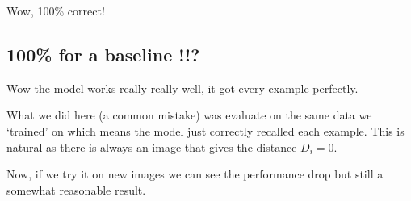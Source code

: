 \documentclass[letterpaper,10pt,english]{sphinxmanual}
\begin{document}
\noindent{}

\sphinxAtStartPar
Wow, 100\% correct!


\subsection{100\% for a baseline !!?}
\label{\detokenize{03-Datasets:for-a-baseline}}
\sphinxAtStartPar
Wow the model works really really well, it got every example perfectly.

\sphinxAtStartPar
What we did here (a common mistake) was evaluate on the same data we ‘trained’ on which means the model just correctly recalled each example. This is natural as there is always an image that gives the distance \(D_i=0\).

\sphinxAtStartPar
Now, if we try it on new images we can see the performance drop but still a somewhat reasonable result.

\begin{sphinxVerbatim}[commandchars=\\\{\}]
      
     
    \PYG{p}{[}\PYG{p}{]} 
      \PYG{p}{[}\PYG{p}{]} \PYG{p}{[}\PYG{p}{]} 
    \PYG{p}{[}\PYG{p}{]}     \PYG{p}{[}\PYG{p}{]}  
\end{sphinxVerbatim}
\end{document}

